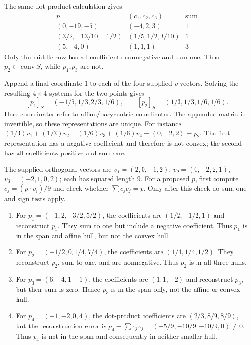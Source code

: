 The same dot-product calculation gives
\[
 \begin{array}{c|c|c}
 p&(c_1,c_2,c_3)&\text{sum}\\\hline
 (0,-19,-5)&(-4,2,3)&1\\
 (3/2,-13/10,-1/2)&(1/5,1/2,3/10)&1\\
 (5,-4,0)&(1,1,1)&3
 \end{array}
\]
Only the middle row has all coefficients nonnegative and sum one.
Thus $p_2\in\operatorname{conv}S$, while $p_1,p_3$ are not.

Append a final coordinate $1$ to each of the four supplied $v$-vectors.
Solving the resulting $4\times4$ systems for the two points gives
\[
 [p_1]_S=(-1/6,1/3,2/3,1/6),\qquad
 [p_2]_S=(1/3,1/3,1/6,1/6).
\]
Here coordinates refer to affine/barycentric coordinates. The appended
matrix is invertible, so these representations are unique.
For instance $(1/3)v_1+(1/3)v_2+(1/6)v_3+(1/6)v_4=(0,-2,2)=p_2$.
The first representation has a negative coefficient and therefore is not
convex; the second has all coefficients positive and sum one.

The supplied orthogonal vectors are
$v_1=(2,0,-1,2)$, $v_2=(0,-2,2,1)$, $v_3=(-2,1,0,2)$;
each has squared length $9$.
For a proposed $p$, first compute $c_j=(p\cdot v_j)/9$ and check whether
$\sum c_jv_j=p$. Only after this check do sum-one and sign tests apply.
\begin{enumerate}[label=(\alph*)]
\item For $p_1=(-1,2,-3/2,5/2)$, the coefficients are $(1/2,-1/2,1)$
and reconstruct $p_1$. They sum to one but include a negative coefficient.
Thus $p_1$ is in the span and affine hull, but not the convex hull.
\item For $p_2=(-1/2,0,1/4,7/4)$, the coefficients are $(1/4,1/4,1/2)$.
They reconstruct $p_2$, sum to one, and are nonnegative. Thus $p_2$ is in
all three hulls.
\item For $p_3=(6,-4,1,-1)$, the coefficients are $(1,1,-2)$ and
reconstruct $p_3$, but their sum is zero. Hence $p_3$ is in the span only,
not the affine or convex hull.
\item For $p_4=(-1,-2,0,4)$, the dot-product coefficients are
$(2/3,8/9,8/9)$, but the reconstruction error is
$p_4-\sum c_jv_j=(-5/9,-10/9,-10/9,0)\ne0$.
Thus $p_4$ is not in the span and consequently in neither smaller hull.
\end{enumerate}

